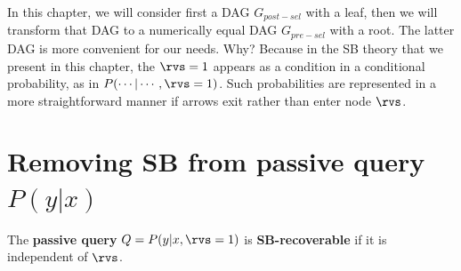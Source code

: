 In this
chapter,
we will consider
first a DAG $G_{post-sel}$
with a leaf,
then we will transform that
DAG to a numerically equal
DAG $G_{pre-sel}$
with a root.
The latter DAG
is more convenient
for our needs. Why?
Because
in the SB theory
that we present in this chapter, the
$\rvs=1$
appears as a condition in a conditional
probability,
as in $P(\cdots|\cdots, \rvs=1)$.
Such probabilities
are represented  in a more
straightforward manner if arrows
exit rather than enter node
$\rvs$.




\section{Removing SB from
passive query $P(y|x)$}

The {\bf  passive query} $Q=P(y|x, \rvs=1)$
is {\bf SB-recoverable}
if it is independent of $\rvs$.







